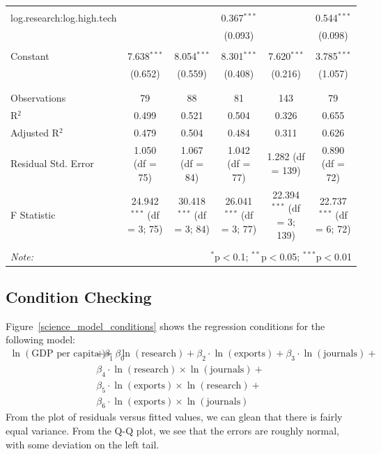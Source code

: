 \documentclass[11pt]{article}
\begin{document}
\begin{landscape}
\begin{table}[!htbp]
\begin{tabular}{@{\extracolsep{5pt}}lccccc}
  & & & & & \\ 
 log.research:log.high.tech &  &  & 0.367$^{***}$ &  & 0.544$^{***}$ \\ 
  &  &  & (0.093) &  & (0.098) \\ 
  & & & & & \\ 
 Constant & 7.638$^{***}$ & 8.054$^{***}$ & 8.301$^{***}$ & 7.620$^{***}$ & 3.785$^{***}$ \\ 
  & (0.652) & (0.559) & (0.408) & (0.216) & (1.057) \\ 
  & & & & & \\ 
\hline \\[-1.8ex] 
Observations & 79 & 88 & 81 & 143 & 79 \\ 
R$^{2}$ & 0.499 & 0.521 & 0.504 & 0.326 & 0.655 \\ 
Adjusted R$^{2}$ & 0.479 & 0.504 & 0.484 & 0.311 & 0.626 \\ 
Residual Std. Error & 1.050 (df = 75) & 1.067 (df = 84) & 1.042 (df = 77) & 1.282 (df = 139) & 0.890 (df = 72) \\ 
F Statistic & 24.942$^{***}$ (df = 3; 75) & 30.418$^{***}$ (df = 3; 84) & 26.041$^{***}$ (df = 3; 77) & 22.394$^{***}$ (df = 3; 139) & 22.737$^{***}$ (df = 6; 72) \\ 
\hline 
\hline \\[-1.8ex] 
\textit{Note:}  & \multicolumn{5}{r}{$^{*}$p$<$0.1; $^{**}$p$<$0.05; $^{***}$p$<$0.01} \\ 
\end{tabular} 
\end{table} 
\end{landscape}
\restoregeometry
\doublespacing


\subsection{Condition Checking}

Figure~\ref{science_model_conditions} shows the regression conditions for the following model:
\begin{align*}
\ln(\textrm{GDP per capita}) = \beta_0 &+
\beta_1 \cdot \ln(\textrm{research}) +
\beta_2 \cdot \ln(\textrm{exports}) +
\beta_3 \cdot \ln(\textrm{journals}) + \\
&\beta_4 \cdot \ln(\textrm{research}) \times \ln(\textrm{journals}) + \\
&\beta_5 \cdot \ln(\textrm{exports}) \times \ln(\textrm{research}) + \\
&\beta_6 \cdot \ln(\textrm{exports}) \times \ln(\textrm{journals})
\end{align*}
From the plot of residuals versus fitted values, we can glean that there is fairly equal variance.
From the Q-Q plot, we see that the errors are roughly normal, with some deviation on the left tail.
\end{document}
